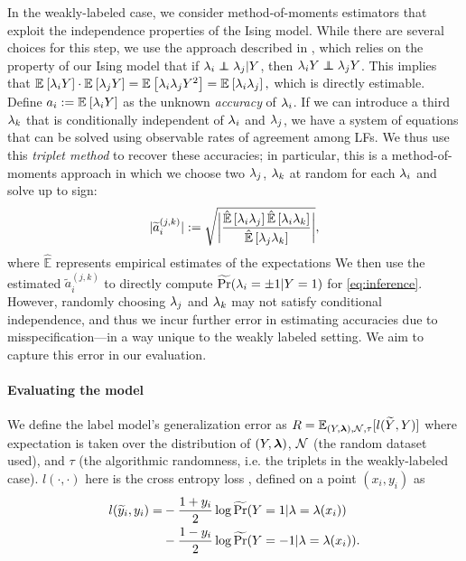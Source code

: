 In the weakly-labeled case, %
we consider method-of-moments estimators that exploit the independence properties of the Ising model. While there are several choices for this step, we use the approach described in \cite{fu2020fast}, which relies on the property of our Ising model
that if $\lf_i \independent \lf_j | Y$, then $\lf_i Y \independent \lf_j Y$.
%
This implies that $\mathbb{E}_{}\left[\lambda_i Y\right] \cdot \mathbb{E}_{}\left[\lambda_j Y\right] = \mathbb{E}_{}\left[\lambda_i \lambda_j Y^2\right] = \mathbb{E}_{}\left[\lambda_i \lambda_j\right],$ which is directly estimable.
Define $a_i := \mathbb{E}_{}\left[\lambda_i Y\right]$ as the unknown \textit{accuracy} of $\lambda_i$. If we can introduce a third $\lambda_k$ that is conditionally independent of $\lambda_i$ and $\lambda_j$, we have a system of equations that can be solved using observable rates of agreement among LFs. We thus use this \textit{triplet method} to recover these accuracies; in particular, this is a method-of-moments approach in which we choose two $\lambda_j$, $\lambda_k$ at random for each $\lambda_i$ and solve up to sign:
\begin{align}
    |\widetilde{a}_i^{(j, k)}| := \sqrt{\bigg| \frac{\hat{\mathbb{E}}\left[\lambda_i \lambda_j\right] \hat{\mathbb{E}}\left[\lambda_i \lambda_k\right]}{\hat{\mathbb{E}}\left[\lambda_j \lambda_k\right]} \bigg|},
    \label{eq:triplet}
\end{align}
where $\hat{\mathbb{E}}$ represents empirical estimates of the expectations %
We then use the estimated $\widetilde{a}_i^{(j, k)}$ to directly compute $\widetilde{\Pr}(\lambda_i = \pm 1 | Y = 1)$ for \eqref{eq:inference}. However, randomly choosing $\lambda_j$ and $\lambda_k$ may not satisfy conditional independence, and thus we incur further error in estimating accuracies due to misspecification---in a way unique to the weakly labeled setting. We aim to capture this error in our evaluation. %

\paragraph{Evaluating the model}

We define the label model's generalization error as $R = \mathbb{E}_{(Y, \bm{\lambda}), \mathcal{N}, \tau}[l(\widetilde{Y}, Y)]$ where expectation is taken over the distribution of $(Y, \bm{\lambda})$, $\mathcal{N}$ (the random dataset used), and $\tau$ (the algorithmic randomness, i.e. the triplets in the weakly-labeled case). $l(\cdot, \cdot)$ here is the cross entropy loss 
, defined on a point $(x_i, y_i)$ as
\begin{align*}
l(\widetilde{y}_i, y_i) = &-\frac{1 + y_i}{2} \log \widetilde{\Pr}(Y = 1 | \lambda = \lambda(x_i)) \\
&- \frac{1 - y_i}{2} \log \widetilde{\Pr}(Y = -1 | \lambda = \lambda(x_i)).
\end{align*}

